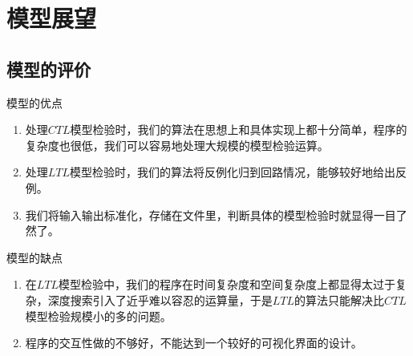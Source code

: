 \documentclass[english]{pkuslide}
\begin{document}
\section{模型展望}
\frame{\sectionpage}
\subsection{模型的评价}
\begin{frame}{模型的优点}
\begin{enumerate}
\item 处理$CTL$模型检验时，我们的算法在思想上和具体实现上都十分简单，程序的复杂度也很低，我们可以容易地处理大规模的模型检验运算。
\item 处理$LTL$模型检验时，我们的算法将反例化归到回路情况，能够较好地给出反例。
\item 我们将输入输出标准化，存储在文件里，判断具体的模型检验时就显得一目了然了。
\end{enumerate}
\end{frame}
\begin{frame}{模型的缺点}
\begin{enumerate}
\item 在$LTL$模型检验中，我们的程序在时间复杂度和空间复杂度上都显得太过于复杂，深度搜索引入了近乎难以容忍的运算量，于是$LTL$的算法只能解决比$CTL$模型检验规模小的多的问题。
\item 程序的交互性做的不够好，不能达到一个较好的可视化界面的设计。
\end{enumerate}
\end{frame}
\end{document}
